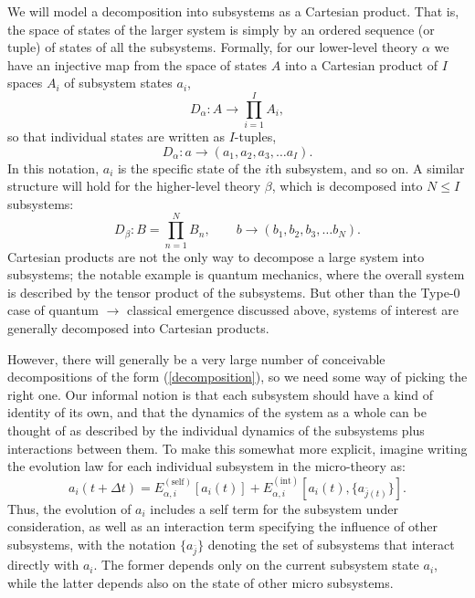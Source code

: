 \documentclass[12pt,english]{article}
\newcommand{\be}{\begin{equation}}
\newcommand{\ee}{\end{equation}}
\begin{document}
We will model a decomposition into subsystems as a Cartesian product.
That is, the space of states of the larger system is simply by an ordered sequence (or tuple) of states of all the subsystems.
Formally, for our lower-level theory $\alpha$ we have an injective map from the space of states $A$ into a Cartesian product of $I$ spaces $A_i$ of subsystem states $a_i$,
\be
  D_\alpha : A\rightarrow \prod_{i=1}^I A_i,
  \label{decomposition}
\ee
so that individual states are written as $I$-tuples,
\be
  D_\alpha : a \rightarrow (a_1, a_2, a_3, \ldots a_I).
\ee
In this notation, $a_i$ is the specific state of the $i$th subsystem, and so on.
A similar structure will hold for the higher-level theory $\beta$, which is decomposed into $N\leq I$ subsystems:
\be
D_\beta : B = \prod_{n=1}^N B_n, \qquad b \rightarrow (b_1, b_2, b_3, \ldots b_N).
\ee 
Cartesian products are not the only way to decompose a large system into subsystems; the notable example is quantum mechanics, where the overall system is described by the tensor product of the subsystems.
But other than the Type-0 case of quantum $\rightarrow$ classical emergence discussed above, systems of interest are generally decomposed into Cartesian products. 

However, there will generally be a very large number of conceivable decompositions of the form (\ref{decomposition}), so we need some way of picking the right one.
Our informal notion is that each subsystem should have a kind of identity of its own, and that the dynamics of the system as a whole can be thought of as described by the individual dynamics of the subsystems plus interactions between them. 
To make this somewhat more explicit, imagine writing the evolution law for each individual subsystem in the micro-theory as:
\be
  a_i(t+\Delta t) = E_{\alpha, i}^{(\mathrm{self})}[a_i(t)] 
  + E_{\alpha,i}^{(\mathrm{int})}[a_i(t), \{a_{\bar{j}(t)}\}]  .
  \label{subsystemdynamics}
\ee
Thus, the evolution of $a_i$ includes a self term for the subsystem under consideration, as well as an interaction term specifying the influence of other subsystems, with the notation $\{a_{\bar{j}}\}$ denoting the set of subsystems that interact directly with $a_i$.
The former depends only on the current subsystem state $a_i$, while the latter depends also on the state of other micro subsystems. 
\end{document}
